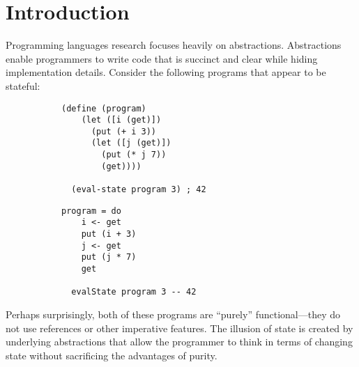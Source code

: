 \documentclass[acmsmall, nonacm, screen]{acmart}
\begin{document}
\section{Introduction} \label{sec:introduction}
Programming languages research focuses heavily on abstractions. Abstractions enable programmers
to write code that is succinct and clear while hiding implementation details. Consider the
following programs that appear to be stateful:
\begin{figure}[H]
\centering
\begin{subfigure}{.5\textwidth}
  \centering
  \begin{lstlisting}[style=rkt]
  (define (program)
    (let ([i (get)])
      (put (+ i 3))
      (let ([j (get)])
        (put (* j 7))
        (get))))

  (eval-state program 3) ; 42
  \end{lstlisting}
  \label{fig:racket-state}
\end{subfigure}%
\begin{subfigure}{.5\textwidth}
  \centering
  \begin{lstlisting}[style=hs]
  program = do
    i <- get
    put (i + 3)
    j <- get
    put (j * 7)
    get

  evalState program 3 -- 42
  \end{lstlisting}
  \label{fig:hs-state}
\end{subfigure}
\label{fig:stateful-comps}
\end{figure}
\noindent Perhaps surprisingly, both of these programs are ``purely'' functional---they do not
use references or other imperative features. The illusion of state is created by underlying
abstractions that allow the programmer to think in terms of changing state without sacrificing
the advantages of purity.
\end{document}
